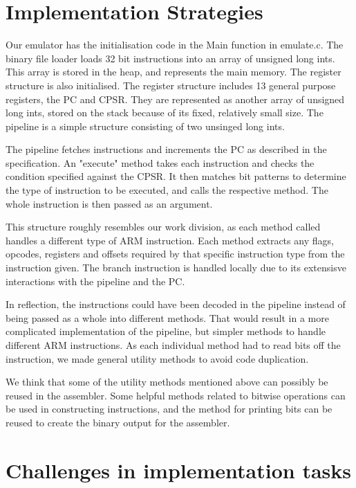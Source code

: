 \documentclass[11pt]{article}
\begin{document}
\section{Implementation Strategies}

Our emulator has the initialisation code in the Main function in emulate.c. The binary file loader loads 32 bit instructions into an array of unsigned long ints. This array is stored in the heap, and represents the main memory. The register structure is also initialised. The register structure includes 13 general purpose registers, the PC and CPSR. They are represented as another array of unsigned long ints, stored on the stack because of its fixed, relatively small size. The pipeline is a simple structure consisting of two unsinged long ints.

\medskip

The pipeline fetches instructions and increments the PC as described in the specification. An "execute" method takes each instruction and checks the condition specified against the CPSR. It then matches bit patterns to determine the type of instruction to be executed, and calls the respective method. The whole instruction is then passed as an argument. 

\medskip

This structure roughly resembles our work division, as each method called handles a different type of ARM instruction. Each method extracts any flags, opcodes, registers and offsets required by that specific instruction type from the instruction given. The branch instruction is handled locally due to its extensisve interactions with the pipeline and the PC.

\medskip

In reflection, the instructions could have been decoded in the pipeline instead of being passed as a whole into different methods. That would result in a more complicated implementation of the pipeline, but simpler methods to handle different ARM instructions. As each individual method had to read bits off the instruction, we made general utility methods to avoid code duplication. 

\medskip

We think that some of the utility methods mentioned above can possibly be reused in the assembler. Some helpful methods related to bitwise operations can be used in constructing instructions, and the method for printing bits can be reused to create the binary output for the assembler.

\section{Challenges in implementation tasks}
\end{document}
